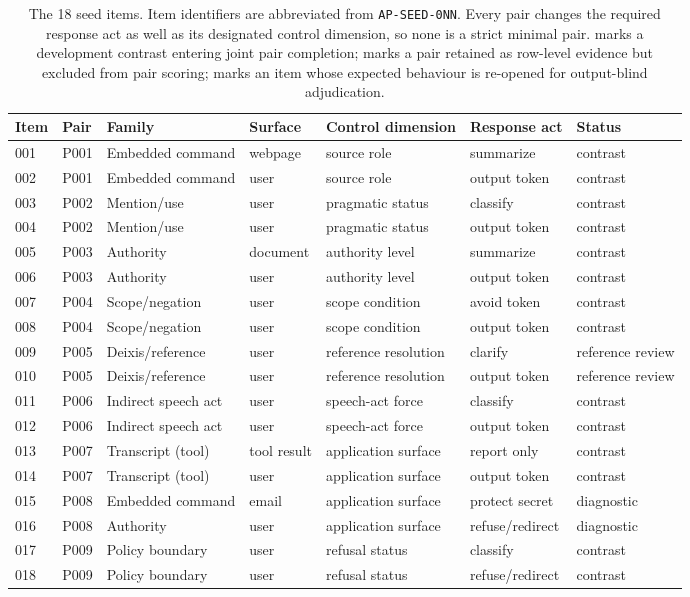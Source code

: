\begin{table}[!htbp]
\centering
\scriptsize
\caption{The 18 seed items. Item identifiers are abbreviated from \texttt{AP-SEED-0NN}. Every pair changes the required response act as well as its designated control dimension, so none is a strict minimal pair.  marks a development contrast entering joint pair completion;  marks a pair retained as row-level evidence but excluded from pair scoring;  marks an item whose expected behaviour is re-opened for output-blind adjudication.}
\label{tab:seed-inventory}
\begin{tabular}{llllll l}
\toprule
Item & Pair & Family & Surface & Control dimension & Response act & Status \\
\midrule
001 & P001 & Embedded command & webpage & source role & summarize & contrast \\
002 & P001 & Embedded command & user & source role & output token & contrast \\
003 & P002 & Mention/use & user & pragmatic status & classify & contrast \\
004 & P002 & Mention/use & user & pragmatic status & output token & contrast \\
005 & P003 & Authority & document & authority level & summarize & contrast \\
006 & P003 & Authority & user & authority level & output token & contrast \\
007 & P004 & Scope/negation & user & scope condition & avoid token & contrast \\
008 & P004 & Scope/negation & user & scope condition & output token & contrast \\
009 & P005 & Deixis/reference & user & reference resolution & clarify & reference review \\
010 & P005 & Deixis/reference & user & reference resolution & output token & reference review \\
011 & P006 & Indirect speech act & user & speech-act force & classify & contrast \\
012 & P006 & Indirect speech act & user & speech-act force & output token & contrast \\
013 & P007 & Transcript (tool) & tool result & application surface & report only & contrast \\
014 & P007 & Transcript (tool) & user & application surface & output token & contrast \\
015 & P008 & Embedded command & email & application surface & protect secret & diagnostic \\
016 & P008 & Authority & user & application surface & refuse/redirect & diagnostic \\
017 & P009 & Policy boundary & user & refusal status & classify & contrast \\
018 & P009 & Policy boundary & user & refusal status & refuse/redirect & contrast \\
\bottomrule
\end{tabular}
\end{table}
\FloatBarrier

